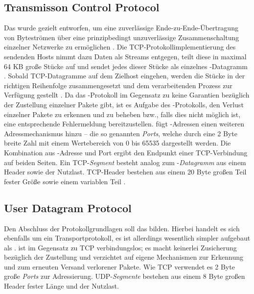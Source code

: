 \subsection{Transmisson Control Protocol}
Das  wurde gezielt entworfen, um eine zuverlässige Ende-zu-Ende-Übertragung von Byteströmen über eine prinzipbedingt unzuverlässige Zusammenschaltung einzelner Netzwerke zu ermöglichen \autocite[Vgl.][552]{Tanenbaum2010}. Die TCP-Protokollimplementierung des sendenden Hosts nimmt dazu Daten als Streams entgegen, teilt diese in maximal 64 KB große Stücke auf und sendet jedes dieser Stücke als einzelnes -Datagramm \autocite[Vgl.][552]{Tanenbaum2010}. Sobald TCP-Datagramme auf dem Zielhost eingehen, werden die Stücke in der richtigen Reihenfolge zusammengesetzt und dem verarbeitenden Prozess zur Verfügung gestellt \autocite[Vgl.][552]{Tanenbaum2010}. Da das -Protokoll im Gegensatz zu  keine Garantien bezüglich der Zustellung einzelner Pakete gibt, ist es Aufgabe des -Protokolls, den Verlust einzelner Pakete zu erkennen und zu beheben bzw., falls dies nicht möglich ist, eine entsprechende Fehlermeldung bereitzustellen.
 fügt -Adressen einen weiteren Adressmechanismus hinzu -- die so genannten \textit{Ports}, welche durch eine 2 Byte breite Zahl mit einem Wertebereich von 0 bis 65535 dargestellt werden. Die Kombination aus -Adresse und Port ergibt den Endpunkt einer TCP-Verbindung auf beiden Seiten. Ein TCP-\textit{Segment} besteht analog zum -\textit{Datagramm} aus einem Header sowie der Nutzlast. TCP-Header bestehen aus einem 20 Byte großen Teil fester Größe sowie einem variablen Teil \autocite[Vgl.][556]{Tanenbaum2010}.
\subsection{User Datagram Protocol}
Den Abschluss der Protokollgrundlagen soll das  bilden. Hierbei handelt es sich ebenfalls um ein Transportprotokoll, es ist allerdings wesentlich simpler aufgebaut als .  ist im Gegensatz zu TCP verbindungslos; es macht keinerlei Zusicherung bezüglich der Zustellung und verzichtet auf eigene Mechanismen zur Erkennung und zum erneuten Versand verlorener Pakete. Wie TCP verwendet es 2 Byte große \textit{Ports} zur Adressierung. UDP-\textit{Segmente} bestehen aus einem 8 Byte großen Header fester Länge und der Nutzlast.